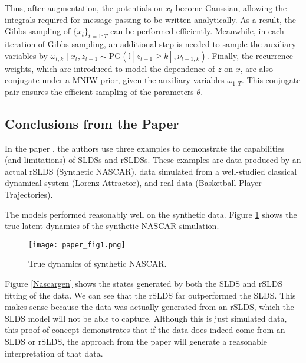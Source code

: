 Thus, after augmentation, the potentials on $x_{t}$ become Gaussian, allowing the integrals required for message passing to be written analytically. As a result, the Gibbs sampling of $\{x_t\}_{t=1:T}$ can be performed efficiently. Meanwhile, in each iteration of Gibbs sampling, an additional step is needed to sample the auxiliary variables by $\omega_{t, k} \mid x_{t}, z_{t+1} \sim \mathrm{PG}\left(\mathbb{I}\left[z_{t+1} \geq k\right], \nu_{t+1, k}\right)$. Finally, the recurrence weights, which are introduced to model the dependence of $z$ on $x$, are also conjugate under a MNIW prior, given the auxiliary variables $\omega_{1: T}$. This conjugate pair ensures the efficient sampling of the parameters $\theta$.



\subsection{Conclusions from the Paper}

In the paper \cite{linderman_bayesian_2017}, the authors use three examples to demonstrate the capabilities (and limitations) of SLDSs and rSLDSs. These examples are data produced by an actual rSLDS (Synthetic NASCAR), data simulated from a well-studied classical dynamical system (Lorenz Attractor), and real data (Basketball Player Trajectories).

The models performed reasonably well on the synthetic data. Figure \ref{trueNascar} shows the true latent dynamics of the synthetic NASCAR simulation.
\begin{figure}[h!]
	\centering
	\texttt{[image: paper\_fig1.png]}
	\caption{True dynamics of synthetic NASCAR.}
	\label{trueNascar}
\end{figure}

Figure \ref{Nascargen} shows the states generated by both the SLDS and rSLDS fitting of the data. We can see that the rSLDS far outperformed the SLDS. This makes sense because the data was actually generated from an rSLDS, which the SLDS model will not be able to capture. Although this is just simulated data, this proof of concept demonstrates that if the data does indeed come from an SLDS or rSLDS, the approach from the paper will generate a reasonable interpretation of that data.

